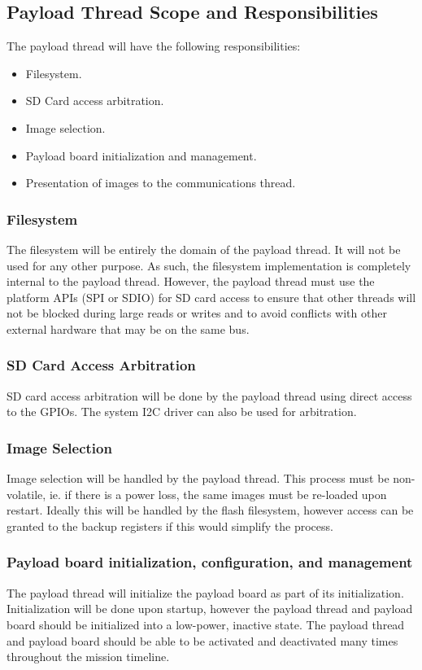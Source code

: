 \documentclass{article}
\begin{document}
\subsection{Payload Thread Scope and Responsibilities}
The payload thread will have the following responsibilities:
\begin{itemize}
    \item Filesystem.
    \item SD Card access arbitration.
    \item Image selection.
    \item Payload board initialization and management.
    \item Presentation of images to the communications thread.
\end{itemize}

\subsubsection{Filesystem}
The filesystem will be entirely the domain of the payload thread. It will not be
used for any other purpose. As such, the filesystem implementation is completely
internal to the payload thread. However, the payload thread must use the
platform APIs (SPI or SDIO) for SD card access to ensure that other threads will not be blocked
during large reads or writes and to avoid conflicts with other external hardware
that may be on the same bus.

\subsubsection{SD Card Access Arbitration}
SD card access arbitration will be done by the payload thread using direct access
to the GPIOs. The system I2C driver can also be used for arbitration.

\subsubsection{Image Selection}
Image selection will be handled by the payload thread. This process must be
non-volatile, ie. if there is a power loss, the same images must be re-loaded
upon restart. Ideally this will be handled by the flash filesystem, however
access can be granted to the backup registers if this would simplify the
process.

\subsubsection{Payload board initialization, configuration, and management}
The payload thread will initialize the payload board as part of its initialization.
Initialization will be done upon startup, however the payload thread and payload
board should be initialized into a low-power, inactive state. The payload thread
and payload board should be able to be activated and deactivated many times
throughout the mission timeline.
\end{document}
